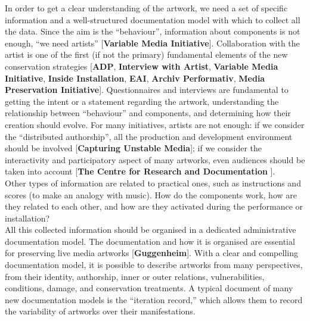 In order to get a clear understanding of the artwork, we need a set of specific information and a well-structured documentation model with which to collect all the data. Since the aim is the ``behaviour'', information about components is not enough, ``we need artists'' [\textbf{Variable Media Initiative}]. Collaboration with the artist is one of the first (if not the primary) fundamental elements of the new conservation strategies [\textbf{ADP}, \textbf{Interview with Artist}, \textbf{Variable Media Initiative}, \textbf{Inside Installation}, \textbf{EAI}, \textbf{Archiv Performativ}, \textbf{Media Preservation Initiative}]. Questionnaires and interviews are fundamental to getting the intent or a statement regarding the artwork, understanding the relationship between ``behaviour'' and components, and determining how their creation should evolve. For many initiatives, artists are not enough: if we consider the ``distributed authorship'', all the production and development environment should be involved [\textbf{Capturing Unstable Media}]; if we consider the interactivity and participatory aspect of many artworks, even audiences should be taken into account \cite{muller2008experience}[\textbf{The Centre for Research and Documentation }].\\ 
Other types of information are related to practical ones, such as instructions and scores (to make an analogy with music). How do the components work, how are they related to each other, and how are they activated during the performance or installation?\\
All this collected information should be organised in a dedicated administrative documentation model. The documentation and how it is organised are essential for preserving live media artworks [\textbf{Guggenheim}]. With a clear and compelling documentation model, it is possible to describe artworks from many perspectives, from their identity, authorship, inner or outer relations, vulnerabilities, conditions, damage, and conservation treatments. A typical document of many new documentation models is the ``iteration record,'' which allows them to record the variability of artworks over their manifestations.


